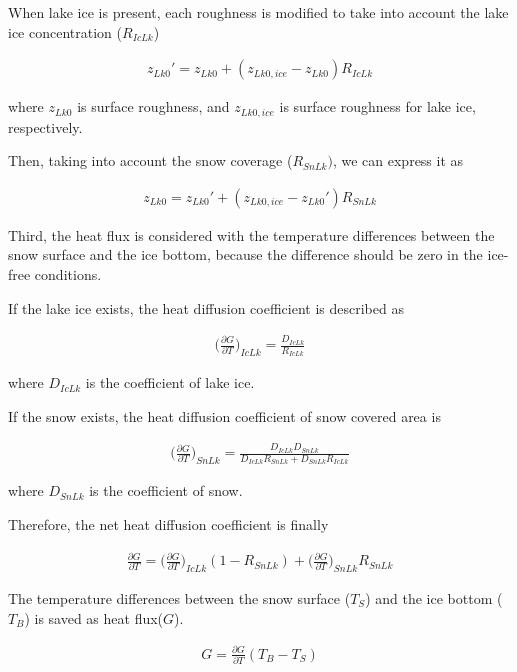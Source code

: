 When lake ice is present, each roughness is modified to take into account the lake ice concentration (\(R_{IcLk}\))

\begin{eqnarray}
    {z_{Lk0}'} = z_{Lk0} + (z_{Lk0,ice} -z_{Lk0}) R_{IcLk}
\end{eqnarray}

where \(z_{Lk0}\) is surface roughness, and \(z_{Lk0,ice}\) is surface roughness for lake ice, respectively.

Then, taking into account the snow coverage (\(R_{SnLk})\), we can express it as

\begin{eqnarray}
    {z_{Lk0}} = {z_{Lk0}'} + (z_{Lk0,ice} - {z_{Lk0}'}) R_{SnLk}
\end{eqnarray}

Third, the heat flux is considered with the temperature differences between the snow surface and the ice bottom, because the difference should be zero in the ice-free conditions.

If the lake ice exists, the heat diffusion coefficient is described as

\begin{eqnarray}
    \Big(\frac{\partial G}{\partial T}\Big) _{ IcLk }  = \frac{ D_{IcLk}}{R_{IcLk}}
\end{eqnarray}

where \(D_{IcLk}\) is the coefficient of lake ice.

If the snow exists, the heat diffusion coefficient of snow covered area is

\begin{eqnarray}
    \Big(\frac{\partial G}{\partial T}\Big)_{SnLk}  =  \frac{D_{IcLk}D_{SnLk}}{D_{IcLk}R_{SnLk}+D_{SnLk}R_{IcLk}}
\end{eqnarray}

where \(D_{SnLk}\) is the coefficient of snow.

Therefore, the net heat diffusion coefficient is finally

\begin{eqnarray}
    \frac{\partial G}{\partial T} = \Big(\frac{\partial G}{\partial T} \Big)_{IcLk} (1-R_{SnLk}) + \Big(\frac{\partial G}{\partial T}\Big)_{SnLk} R_{SnLk}
\end{eqnarray}

The temperature differences between the snow surface (\(T_S\)) and the ice bottom (\(T_B\)) is saved as heat flux(\(G\)).

\begin{eqnarray}
    G = \frac{\partial G}{\partial T} (T_B-T_S)
\end{eqnarray}


